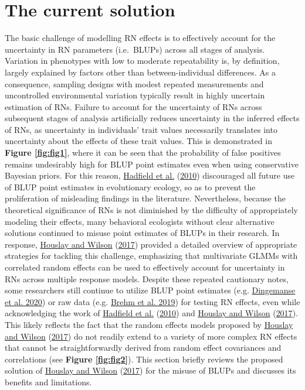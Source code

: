 \documentclass{article}
\begin{document}
\hypertarget{the-current-solution}{%
\section{The current solution}\label{the-current-solution}}

The basic challenge of modelling RN effects is to effectively account
for the uncertainty in RN parameters (i.e.~BLUPs) across all stages of
analysis. Variation in phenotypes with low to moderate repeatability is,
by definition, largely explained by factors other than
between-individual differences. As a consequence, sampling designs with
modest repeated measurements and uncontrolled environmental variation
typically result in highly uncertain estimation of RNs. Failure to
account for the uncertainty of RNs across subsequent stages of analysis
artificially reduces uncertainty in the inferred effects of RNs, as
uncertainty in individuals' trait values necessarily translates into
uncertainty about the effects of these trait values. This is
demonstrated in \textbf{Figure \ref{fig:fig1}}, where it can be seen
that the probability of false positives remains undesirably high for
BLUP point estimates even when using conservative Bayesian priors. For
this reason, \protect\hyperlink{ref-Hadfield2010}{Hadfield et al.}
(\protect\hyperlink{ref-Hadfield2010}{2010}) discouraged all future use
of BLUP point estimates in evolutionary ecology, so as to prevent the
proliferation of misleading findings in the literature. Nevertheless,
because the theoretical significance of RNs is not diminished by the
difficulty of appropriately modeling their effects, many behavioral
ecologists without clear alternative solutions continued to misuse point
estimates of BLUPs in their research. In response,
\protect\hyperlink{ref-Hous2017}{Houslay and Wilson}
(\protect\hyperlink{ref-Hous2017}{2017}) provided a detailed overview of
appropriate strategies for tackling this challenge, emphasizing that
multivariate GLMMs with correlated random effects can be used to
effectively account for uncertainty in RNs across multiple response
models. Despite these repeated cautionary notes, some researchers still
continue to utilize BLUP point estimates (e.g.
\protect\hyperlink{ref-Ding2020b}{Dingemanse et al. 2020}) or raw data
(e.g. \protect\hyperlink{ref-Brehm2019}{Brehm et al. 2019}) for testing
RN effects, even while acknowledging the work of
\protect\hyperlink{ref-Hadfield2010}{Hadfield et al.}
(\protect\hyperlink{ref-Hadfield2010}{2010}) and
\protect\hyperlink{ref-Hous2017}{Houslay and Wilson}
(\protect\hyperlink{ref-Hous2017}{2017}). This likely reflects the fact
that the random effects models proposed by
\protect\hyperlink{ref-Hous2017}{Houslay and Wilson}
(\protect\hyperlink{ref-Hous2017}{2017}) do not readily extend to a
variety of more complex RN effects that cannot be straightforwardly
derived from random effect covariances and correlations (see
\textbf{Figure \ref{fig:fig2}}). This section briefly reviews the
proposed solution of \protect\hyperlink{ref-Hous2017}{Houslay and
Wilson} (\protect\hyperlink{ref-Hous2017}{2017}) for the misuse of BLUPs
and discusses its benefits and limitations.
\end{document}
